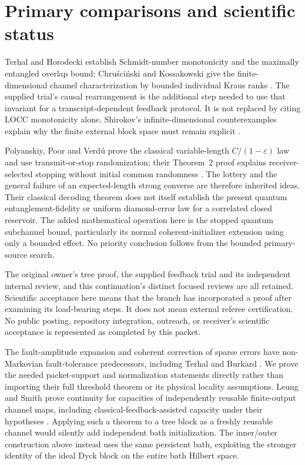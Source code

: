 \documentclass[11pt]{article}
\begin{document}
\section{Primary comparisons and scientific status}

Terhal and Horodecki establish Schmidt-number monotonicity and the maximally entangled overlap bound; Chru\'sci\'nski and Kossakowski give the finite-dimensional channel characterization by bounded individual Kraus ranks \cite{TH,CK}. The supplied trial's causal rearrangement is the additional step needed to use that invariant for a transcript-dependent feedback protocol. It is not replaced by citing LOCC monotonicity alone. Shirokov's infinite-dimensional counterexamples explain why the finite external block space must remain explicit \cite{Shirokov}.

Polyanskiy, Poor and Verd\'u prove the classical variable-length $C/(1-\varepsilon)$ law and use transmit-or-stop randomization; their Theorem~2 proof explains receiver-selected stopping without initial common randomness \cite{PPV}. The lottery and the general failure of an expected-length strong converse are therefore inherited ideas. Their classical decoding theorem does not itself establish the present quantum entanglement-fidelity or uniform diamond-error law for a correlated closed reservoir. The added mathematical operation here is the stopped quantum subchannel bound, particularly its normal coherent-initializer extension using only a bounded effect. No priority conclusion follows from the bounded primary-source search.

The original owner's tree proof, the supplied feedback trial and its independent internal review, and this continuation's distinct focused reviews are all retained. Scientific acceptance here means that the branch has incorporated a proof after examining its load-bearing steps. It does not mean external referee certification. No public posting, repository integration, outreach, or receiver's scientific acceptance is represented as completed by this packet.

The fault-amplitude expansion and coherent correction of sparse errors have non-Markovian fault-tolerance predecessors, including Terhal and Burkard \cite{TB}. We prove the needed packet-support and normalization statements directly rather than importing their full threshold theorem or its physical locality assumptions. Leung and Smith prove continuity for capacities of independently reusable finite-output channel maps, including classical-feedback-assisted capacity under their hypotheses \cite{LS}. Applying such a theorem to a tree block as a freshly reusable channel would silently add independent bath initialization. The inner/outer construction above instead uses the same persistent bath, exploiting the stronger identity of the ideal Dyck block on the entire bath Hilbert space.
\end{document}
